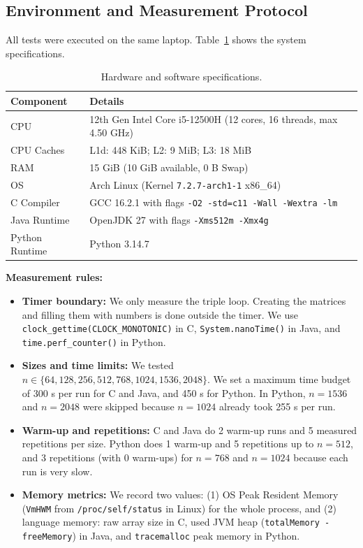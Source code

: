 \documentclass[11pt,a4paper]{article}
\begin{document}
\subsection{Environment and Measurement Protocol}
All tests were executed on the same laptop. Table~\ref{tab:env} shows the system specifications.

\begin{table}[H]
\centering
\caption{Hardware and software specifications.}
\label{tab:env}
\small
\begin{tabular}{ll}
\toprule
\textbf{Component} & \textbf{Details} \\
\midrule
CPU & 12th Gen Intel Core i5-12500H (12 cores, 16 threads, max 4.50 GHz) \\
CPU Caches & L1d: 448 KiB; L2: 9 MiB; L3: 18 MiB \\
RAM & 15 GiB (10 GiB available, 0 B Swap) \\
OS & Arch Linux (Kernel \texttt{7.2.7-arch1-1} x86\_64) \\
C Compiler & GCC 16.2.1 with flags \texttt{-O2 -std=c11 -Wall -Wextra -lm} \\
Java Runtime & OpenJDK 27 with flags \texttt{-Xms512m -Xmx4g} \\
Python Runtime & Python 3.14.7 \\
\bottomrule
\end{tabular}
\end{table}

\noindent
\textbf{Measurement rules:}
\begin{itemize}
    \item \textbf{Timer boundary:} We only measure the triple loop. Creating the matrices and filling them with numbers is done outside the timer. We use \texttt{clock\_gettime(CLOCK\_MONOTONIC)} in C, \texttt{System.nanoTime()} in Java, and \texttt{time.perf\_counter()} in Python.
    \item \textbf{Sizes and time limits:} We tested $n \in \{64, 128, 256, 512, 768, 1024, 1536, 2048\}$. We set a maximum time budget of 300 s per run for C and Java, and 450 s for Python. In Python, $n=1536$ and $n=2048$ were skipped because $n=1024$ already took 255 s per run.
    \item \textbf{Warm-up and repetitions:} C and Java do 2 warm-up runs and 5 measured repetitions per size. Python does 1 warm-up and 5 repetitions up to $n=512$, and 3 repetitions (with 0 warm-ups) for $n=768$ and $n=1024$ because each run is very slow.
    \item \textbf{Memory metrics:} We record two values: (1) OS Peak Resident Memory (\texttt{VmHWM} from \texttt{/proc/self/status} in Linux) for the whole process, and (2) language memory: raw array size in C, used JVM heap (\texttt{totalMemory - freeMemory}) in Java, and \texttt{tracemalloc} peak memory in Python.
\end{itemize}
\end{document}
